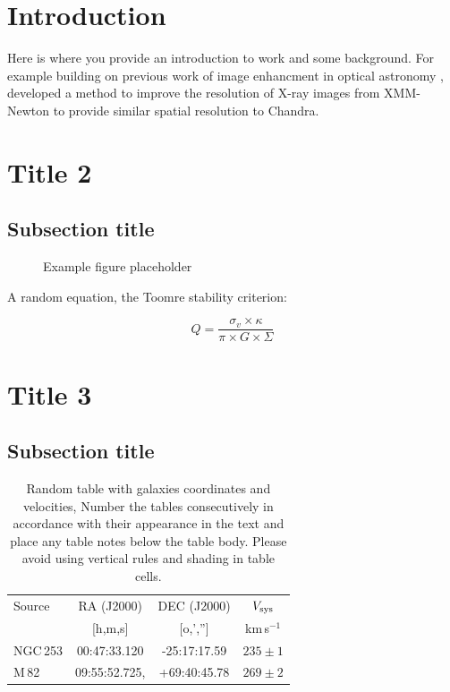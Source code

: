 \documentclass[final,5p,times,twocolumn,authoryear]{elsarticle}
\newcommand{\kms}{km\,s$^{-1}$}
\begin{document}



\section{Introduction}
\label{introduction}

Here is where you provide an introduction to work and some background. For example building on previous work of image enhancment in optical astronomy \citep{vojtekova2021learning}, \cite{sweere2022deep} developed a method to improve the resolution of X-ray images from XMM-Newton to provide similar spatial resolution to Chandra.

\section{Title 2}
\lipsum[1]

\subsection{Subsection title}

\begin{figure}
	\centering 
	\fbox{\rule{0pt}{1.2in}\rule{0.4\textwidth}{0pt}}	
	\caption{Example figure placeholder} 
	\label{fig_mom0}%
\end{figure}

A random equation, the Toomre stability criterion:

\begin{equation}
    Q = \frac{\sigma_v \times \kappa}{\pi \times G \times \Sigma}
\end{equation}

\section{Title 3}
\lipsum[2]

\subsection{Subsection title}
\lipsum[3]

\begin{table}
\begin{tabular}{l c c c} 
 \hline
 Source & RA (J2000) & DEC (J2000) & $V_{\rm sys}$ \\ 
        & [h,m,s]    & [o,','']    & \kms          \\
 \hline
 NGC\,253 & 	00:47:33.120 & -25:17:17.59 & $235 \pm 1$ \\ 
 M\,82 & 09:55:52.725, & +69:40:45.78 & $269 \pm 2$ 	 \\ 
 \hline
\end{tabular}
\caption{Random table with galaxies coordinates and velocities, Number the tables consecutively in
accordance with their appearance in the text and place any table notes below the table body. Please avoid using vertical rules and shading in table cells.
}
\label{Table1}
\end{table}
\end{document}
